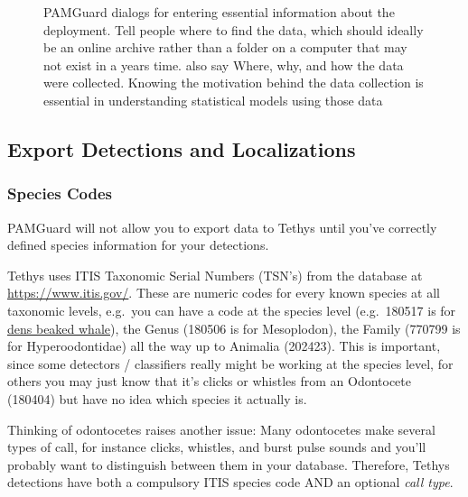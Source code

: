 \documentclass[
]{article}
\begin{document}
\begin{figure}
\begin{minipage}{0.50\linewidth}
{}


\end{minipage}%

\caption{\label{fig-exportdeps}PAMGuard dialogs for entering essential
information about the deployment. Tell people where to find the data,
which should ideally be an online archive rather than a folder on a
computer that may not exist in a years time. also say Where, why, and
how the data were collected. Knowing the motivation behind the data
collection is essential in understanding statistical models using those
data}

\end{figure}%

\subsection{Export Detections and
Localizations}\label{export-detections-and-localizations}

\subsubsection{Species Codes}\label{species-codes}

PAMGuard will not allow you to export data to Tethys until you've
correctly defined species information for your detections.

Tethys uses ITIS Taxonomic Serial Numbers (TSN's) from the database at
\url{https://www.itis.gov/}. These are numeric codes for every known
species at all taxonomic levels, e.g.~you can have a code at the species
level (e.g.~180517 is for
\href{https://www.itis.gov/servlet/SingleRpt/SingleRpt?search_topic=TSN&search_value=180517\#null}{dens
beaked whale}), the Genus (180506 is for Mesoplodon), the Family (770799
is for Hyperoodontidae) all the way up to Animalia (202423). This is
important, since some detectors / classifiers really might be working at
the species level, for others you may just know that it's clicks or
whistles from an Odontocete (180404) but have no idea which species it
actually is.

Thinking of odontocetes raises another issue: Many odontocetes make
several types of call, for instance clicks, whistles, and burst pulse
sounds and you'll probably want to distinguish between them in your
database. Therefore, Tethys detections have both a compulsory ITIS
species code AND an optional \emph{call type}.
\end{document}

